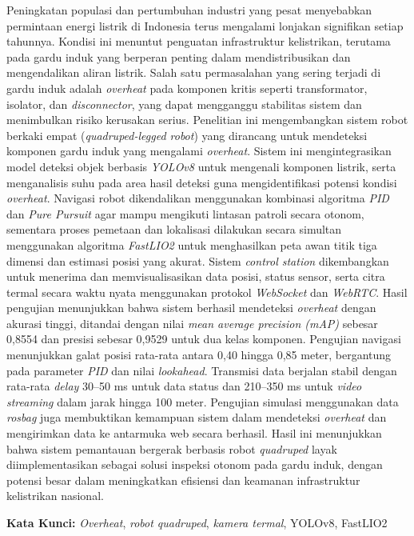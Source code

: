 \vspace{2ex}
  Peningkatan populasi dan pertumbuhan industri yang pesat menyebabkan permintaan energi listrik di Indonesia terus mengalami lonjakan signifikan setiap tahunnya. Kondisi ini menuntut penguatan infrastruktur kelistrikan, terutama pada gardu induk yang berperan penting dalam mendistribusikan dan mengendalikan aliran listrik. Salah satu permasalahan yang sering terjadi di gardu induk adalah \emph{overheat} pada komponen kritis seperti transformator, isolator, dan \emph{disconnector}, yang dapat mengganggu stabilitas sistem dan menimbulkan risiko kerusakan serius.  Penelitian ini mengembangkan sistem robot berkaki empat (\emph{quadruped-legged robot}) yang dirancang untuk mendeteksi komponen gardu induk yang mengalami \emph{overheat}. Sistem ini mengintegrasikan model deteksi objek berbasis \emph{YOLOv8} untuk mengenali komponen listrik, serta menganalisis suhu pada area hasil deteksi guna mengidentifikasi potensi kondisi \emph{overheat}. Navigasi robot dikendalikan menggunakan kombinasi algoritma \emph{PID} dan \emph{Pure Pursuit} agar mampu mengikuti lintasan patroli secara otonom, sementara proses pemetaan dan lokalisasi dilakukan secara simultan menggunakan algoritma \emph{FastLIO2} untuk menghasilkan peta awan titik tiga dimensi dan estimasi posisi yang akurat. Sistem \emph{control station} dikembangkan untuk menerima dan memvisualisasikan data posisi, status sensor, serta citra termal secara waktu nyata menggunakan protokol \emph{WebSocket} dan \emph{WebRTC}. Hasil pengujian menunjukkan bahwa sistem berhasil mendeteksi \emph{overheat} dengan akurasi tinggi, ditandai dengan nilai \emph{mean average precision (mAP)} sebesar 0{,}8554 dan presisi sebesar 0{,}9529 untuk dua kelas komponen. Pengujian navigasi menunjukkan galat posisi rata-rata antara 0{,}40 hingga 0{,}85 meter, bergantung pada parameter \emph{PID} dan nilai \emph{lookahead}. Transmisi data berjalan stabil dengan rata-rata \emph{delay} 30--50 ms untuk data status dan 210--350 ms untuk \emph{video streaming} dalam jarak hingga 100 meter. Pengujian simulasi menggunakan data \emph{rosbag} juga membuktikan kemampuan sistem dalam mendeteksi \emph{overheat} dan mengirimkan data ke antarmuka web secara berhasil. Hasil ini menunjukkan bahwa sistem pemantauan bergerak berbasis robot \emph{quadruped} layak diimplementasikan sebagai solusi inspeksi otonom pada gardu induk, dengan potensi besar dalam meningkatkan efisiensi dan keamanan infrastruktur kelistrikan nasional.
  

\vspace{2ex}
\noindent
\textbf{Kata Kunci:} \emph{Overheat}, \emph{robot quadruped}, \emph{kamera termal}, YOLOv8, FastLIO2
